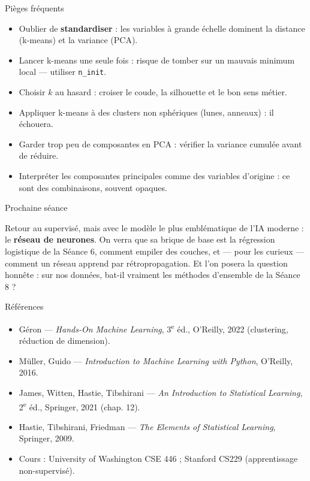 \documentclass[aspectratio=169,11pt]{beamer}
\begin{document}
\begin{frame}{Pièges fréquents}
\begin{itemize}\small
  \item Oublier de \textbf{standardiser} : les variables à grande échelle dominent la distance (k-means) et la variance (PCA).
  \item Lancer k-means une seule fois : risque de tomber sur un mauvais minimum local — utiliser \texttt{n\_init}.
  \item Choisir $k$ au hasard : croiser le coude, la silhouette et le bon sens métier.
  \item Appliquer k-means à des clusters non sphériques (lunes, anneaux) : il échouera.
  \item Garder trop peu de composantes en PCA : vérifier la variance cumulée avant de réduire.
  \item Interpréter les composantes principales comme des variables d'origine : ce sont des combinaisons, souvent opaques.
\end{itemize}
\end{frame}

\begin{frame}{Prochaine séance}
\begin{ucadfront}
{\small Retour au supervisé, mais avec le modèle le plus emblématique de l'IA moderne : le \textbf{réseau de neurones}. On verra que sa brique de base est la régression logistique de la Séance 6, comment empiler des couches, et — pour les curieux — comment un réseau apprend par rétropropagation. Et l'on posera la question honnête : sur nos données, bat-il vraiment les méthodes d'ensemble de la Séance 8 ?}
\end{ucadfront}
\end{frame}

\begin{frame}{Références}
\begin{itemize}\small
  \item Géron — \emph{Hands-On Machine Learning}, 3\textsuperscript{e} éd., O'Reilly, 2022 (clustering, réduction de dimension).
  \item Müller, Guido — \emph{Introduction to Machine Learning with Python}, O'Reilly, 2016.
  \item James, Witten, Hastie, Tibshirani — \emph{An Introduction to Statistical Learning}, 2\textsuperscript{e} éd., Springer, 2021 (chap. 12).
  \item Hastie, Tibshirani, Friedman — \emph{The Elements of Statistical Learning}, Springer, 2009.
  \item Cours : University of Washington CSE 446 ; Stanford CS229 (apprentissage non-supervisé).
\end{itemize}
\end{frame}
\end{document}
